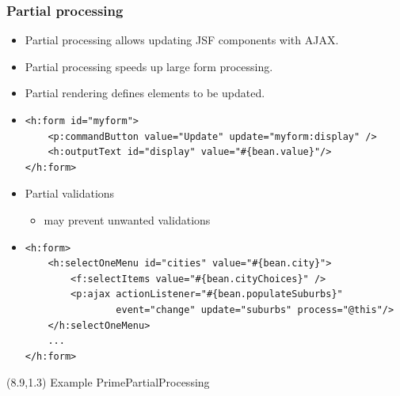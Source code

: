 \documentclass[10pt,xcolor=pdflatex]{beamer}
\begin{document}
\begin{frame}[containsverbatim]\frametitle{Partial processing}
  \begin{itemize}
    \item Partial processing allows updating JSF components with AJAX.
	\item Partial processing speeds up large form processing.
	\item Partial rendering defines elements to be updated.
  	\item[] \begin{footnotesize}\begin{verbatim}
<h:form id="myform">
    <p:commandButton value="Update" update="myform:display" />
    <h:outputText id="display" value="#{bean.value}"/>
</h:form>    	
\end{verbatim} \end{footnotesize}
    \item Partial validations
	  \begin{itemize}
		\item may prevent unwanted validations
	  \end{itemize}
    \item[] \begin{footnotesize} \begin{verbatim}
<h:form>
    <h:selectOneMenu id="cities" value="#{bean.city}">
        <f:selectItems value="#{bean.cityChoices}" />
        <p:ajax actionListener="#{bean.populateSuburbs}"
                event="change" update="suburbs" process="@this"/>
    </h:selectOneMenu>
    ...
</h:form>    	
\end{verbatim} \end{footnotesize}
  \end{itemize}
\begin{textblock}{15}(8.9,1.3)
    {\footnotesize Example PrimePartialProcessing}
\end{textblock}
\end{frame}
\end{document}
